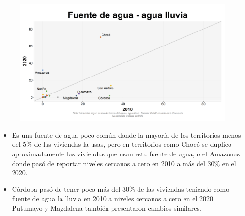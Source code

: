     \begin{figure}[H]
        \caption[Agua lluvia como fuentes de agua por departamentos - 2010 VS 2020 ]{\label{agua_lluvia_dptos_vs} }
        \begin{center}
        \includegraphics[width=\textwidth,keepaspectratio]{img/var_139_scatter_time.png}
        \end{center}
    \end{figure}
            \begin{itemize}
                    \item Es una fuente de agua poco común donde la mayoría de los territorios menos del 5\% de las viviendas la usas, pero en territorios como Chocó se duplicó aproximadamente las viviendas que usan esta fuente de agua, o el Amazonas donde pasó de reportar niveles cercanos a cero en 2010 a más del 30\% en el 2020.
                    \item Córdoba pasó de tener poco más del 30\% de las viviendas teniendo como fuente de agua la lluvia en 2010 a niveles cercanos a cero en el 2020, Putumayo y Magdalena también presentaron cambios similares.
                    \end{itemize}

